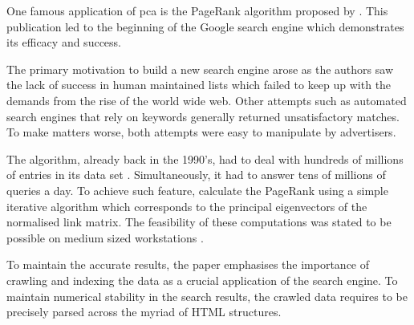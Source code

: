 One famous application of \acrlong{pca} \cite{deisenroth2020mathematics} is the PageRank algorithm proposed by .
This publication led to the beginning of the Google search engine which demonstrates its efficacy and success.

The primary motivation to build a new search engine arose as the authors saw the lack of success in human maintained lists which failed to keep up with the demands from the rise of the world wide web.
Other attempts such as automated search engines that rely on keywords generally returned unsatisfactory matches.
To make matters worse, both attempts were easy to manipulate by advertisers.
\bigskip


The algorithm, already back in the 1990's, had to deal with hundreds of millions of entries in its data set \cite{brin1998anatomy}.
Simultaneously, it had to answer tens of millions of queries a day.
To achieve such feature, \citeauthor{page1999pagerank} calculate the PageRank using a simple iterative algorithm which corresponds to the principal eigenvectors of the normalised link matrix.
The feasibility of these computations was stated to be possible on medium sized workstations \cite{page1999pagerank}.

To maintain the accurate results, the paper emphasises the importance of crawling and indexing the data as a crucial application of the search engine.
To maintain numerical stability in the search results, the crawled data requires to be precisely parsed across the myriad of HTML structures.
